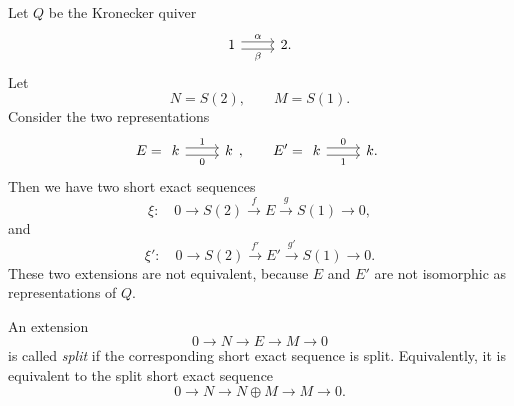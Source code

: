 \documentclass[11pt, a4paper]{report}
\begin{document}
    \begin{example}
    Let \(Q\) be the Kronecker quiver
    \[
    \begin{tikzcd}
    1 \arrow[r,shift left=0.6ex,"\alpha"]
      \arrow[r,shift right=0.6ex,"\beta"'] & 2 .
    \end{tikzcd}
    \]
    Let
    \[
        N=S(2),
        \qquad
        M=S(1).
    \]
    Consider the two representations
    \[
        E=
        \begin{tikzcd}
        k \arrow[r,shift left=0.6ex,"1"]
          \arrow[r,shift right=0.6ex,"0"'] & k
        \end{tikzcd},
        \qquad
        E'=
        \begin{tikzcd}
        k \arrow[r,shift left=0.6ex,"0"]
          \arrow[r,shift right=0.6ex,"1"'] & k .
        \end{tikzcd}
    \]
    Then we have two short exact sequences
    \[
        \xi:\quad
        0
        \longrightarrow
        S(2)
        \xrightarrow{f}
        E
        \xrightarrow{g}
        S(1)
        \longrightarrow
        0,
    \]
    and
    \[
        \xi':\quad
        0
        \longrightarrow
        S(2)
        \xrightarrow{f'}
        E'
        \xrightarrow{g'}
        S(1)
        \longrightarrow
        0.
    \]
    These two extensions are not equivalent, because \(E\) and \(E'\) are not
    isomorphic as representations of \(Q\).
    \end{example}

    \begin{definition}
    An extension
    \[
        0
        \longrightarrow
        N
        \longrightarrow
        E
        \longrightarrow
        M
        \longrightarrow
        0
    \]
    is called \emph{split} if the corresponding short exact sequence is split. Equivalently,
    it is equivalent to the split short exact sequence
    \[
        0
        \longrightarrow
        N
        \longrightarrow
        N\oplus M
        \longrightarrow
        M
        \longrightarrow
        0.
    \]
    \end{definition}
\end{document}
